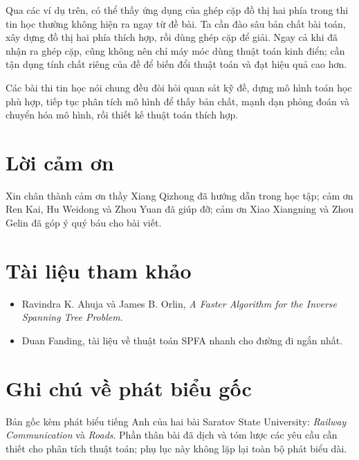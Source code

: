 \documentclass[11pt]{article}
\begin{document}
Qua các ví dụ trên, có thể thấy ứng dụng của ghép cặp đồ thị hai phía trong
thi tin học thường không hiện ra ngay từ đề bài. Ta cần đào sâu bản chất bài
toán, xây dựng đồ thị hai phía thích hợp, rồi dùng ghép cặp để giải. Ngay cả
khi đã nhận ra ghép cặp, cũng không nên chỉ máy móc dùng thuật toán kinh điển;
cần tận dụng tính chất riêng của đề để biến đổi thuật toán và đạt hiệu quả cao
hơn.

Các bài thi tin học nói chung đều đòi hỏi quan sát kỹ đề, dựng mô hình toán
học phù hợp, tiếp tục phân tích mô hình để thấy bản chất, mạnh dạn phỏng đoán
và chuyển hóa mô hình, rồi thiết kế thuật toán thích hợp.

\section*{Lời cảm ơn}

Xin chân thành cảm ơn thầy Xiang Qizhong đã hướng dẫn trong học tập; cảm ơn
Ren Kai, Hu Weidong và Zhou Yuan đã giúp đỡ; cảm ơn Xiao Xiangning và Zhou
Gelin đã góp ý quý báu cho bài viết.

\section*{Tài liệu tham khảo}

\begin{itemize}
  \item Ravindra K. Ahuja và James B. Orlin, \textit{A Faster Algorithm for
  the Inverse Spanning Tree Problem}.
  \item Duan Fanding, tài liệu về thuật toán SPFA nhanh cho đường đi ngắn
  nhất.
\end{itemize}

\appendix
\section{Ghi chú về phát biểu gốc}

Bản gốc kèm phát biểu tiếng Anh của hai bài Saratov State University:
\textit{Railway Communication} và \textit{Roads}. Phần thân bài đã dịch và
tóm lược các yêu cầu cần thiết cho phân tích thuật toán; phụ lục này không
lặp lại toàn bộ phát biểu dài.
\end{document}
